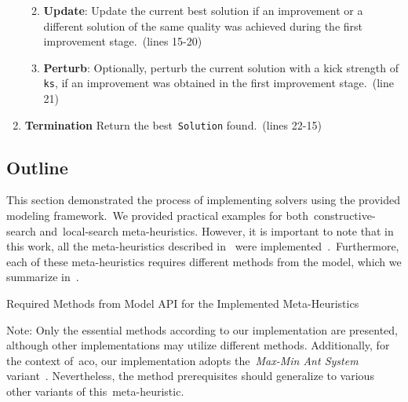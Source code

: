 \begin{enumerate}
\begin{enumerate}
\begin{enumerate}
                        \end{enumerate}
                  \item \textbf{Update}: Update the current best solution if an improvement or a
                        different solution of the same quality was achieved during the first
                        improvement stage.~(lines 15-20)
                  \item \textbf{Perturb}: Optionally, perturb the current solution with a
                        kick strength of \texttt{ks}, if an improvement was obtained in the
                        first improvement stage.~(line 21)
            \end{enumerate}
      \item \textbf{Termination} Return the best~\texttt{Solution} found.~(lines 22-15)
\end{enumerate}

\subsection{Outline}
\label{subsec:solver-outline}

This section demonstrated the process of implementing solvers using the provided
modeling framework.~We provided practical examples for
both~\acrshort{constructive-search} and~\acrshort{local-search} meta-heuristics.
However, it is important to note that in this work, all the meta-heuristics
described in~ were
implemented~\cite{rodriguesnasf4niopy}.~Furthermore, each of these
meta-heuristics requires different methods from the model, which we summarize
in~.

\begin{table}[h]
      \centering
      
      \caption{Required Methods from Model API for the Implemented Meta-Heuristics}
      \caption*{\small Note: Only the essential methods according to our
            implementation are presented, although other implementations may utilize
            different methods. Additionally, for the context of~\acrshort{aco}, our
            implementation adopts the~\emph{Max-Min Ant System} variant~\cite{stutzle1999maxmin}. Nevertheless, the
            method prerequisites should generalize to various other variants of this~\acrshort{meta-heuristic}.}
      \label{tab:mh-api-methods}
\end{table}